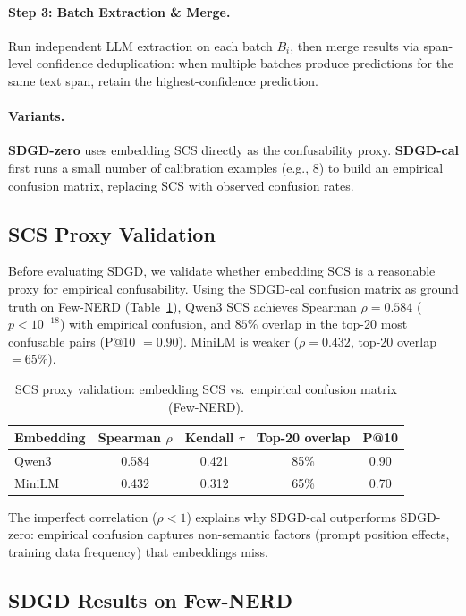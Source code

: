 \documentclass[11pt,a4paper]{article}
\begin{document}
\paragraph{Step 3: Batch Extraction \& Merge.}
Run independent LLM extraction on each batch $B_i$, then merge results via span-level confidence deduplication:
when multiple batches produce predictions for the same text span, retain the highest-confidence prediction.

\paragraph{Variants.}
\textbf{SDGD-zero} uses embedding SCS directly as the confusability proxy.
\textbf{SDGD-cal} first runs a small number of calibration examples (e.g., 8) to build an empirical confusion matrix, replacing SCS with observed confusion rates.


\subsection{SCS Proxy Validation}
\label{sec:proxy}

Before evaluating SDGD, we validate whether embedding SCS is a reasonable proxy for empirical confusability.
Using the SDGD-cal confusion matrix as ground truth on Few-NERD (Table~\ref{tab:proxy-valid}), Qwen3 SCS achieves Spearman $\rho{=}0.584$ ($p{<}10^{-18}$) with empirical confusion, and $85\%$ overlap in the top-20 most confusable pairs (P@10 $= 0.90$).
MiniLM is weaker ($\rho{=}0.432$, top-20 overlap $= 65\%$).

\begin{table}[t]
\centering
\small
\caption{SCS proxy validation: embedding SCS vs.\ empirical confusion matrix (Few-NERD).}
\label{tab:proxy-valid}
\begin{tabular}{lcccc}
\toprule
Embedding & Spearman $\rho$ & Kendall $\tau$ & Top-20 overlap & P@10 \\
\midrule
Qwen3  & 0.584 & 0.421 & 85\% & 0.90 \\
MiniLM & 0.432 & 0.312 & 65\% & 0.70 \\
\bottomrule
\end{tabular}
\end{table}

The imperfect correlation ($\rho{<}1$) explains why SDGD-cal outperforms SDGD-zero: empirical confusion captures non-semantic factors (prompt position effects, training data frequency) that embeddings miss.


\subsection{SDGD Results on Few-NERD}
\label{sec:sdgd-fewnerd}
\end{document}
